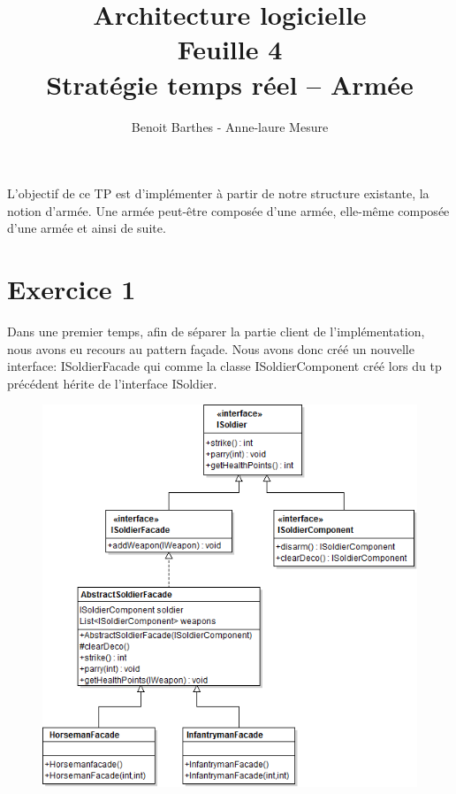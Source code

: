 \documentclass[%
a4paper,
11pt
]{article}
\begin{document}
\title{Architecture logicielle \\ Feuille 4 \\ Stratégie temps réel – Armée}
\author{Benoit Barthes - Anne-laure Mesure}
\maketitle

L'objectif de ce TP est d'implémenter à partir de notre structure existante, la notion d'armée. Une armée peut-être composée d'une armée, elle-même composée d'une armée et ainsi de suite.

 \newpage
\section*{Exercice 1}

Dans une premier temps, afin de séparer la partie client de l'implémentation, nous avons eu recours au pattern façade. Nous avons donc créé un nouvelle interface: ISoldierFacade qui comme la classe ISoldierComponent créé lors du tp précédent hérite de l'interface ISoldier.

\begin{figure}[!ht]
    \center
    \includegraphics[width =13cm]{imgs/facade.png}
\end{figure}
\end{document}
